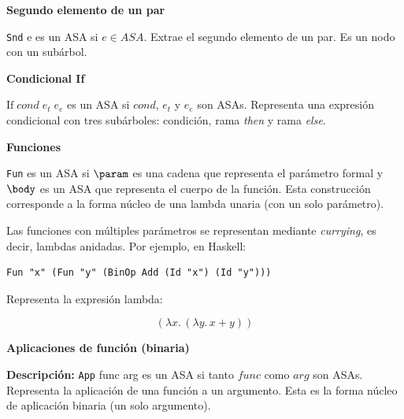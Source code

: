 \documentclass[a4paper,12pt]{article}
\begin{document}
\begin{tcolorbox}[title=Correción:ASA de  LAMBDAE    MÓDULO A3, breakable]
\textbf{Segundo elemento de un par}

 \texttt{Snd}\; e es un ASA si \( e \in ASA \). Extrae el segundo elemento de un par. Es un nodo con un sub\'arbol.

\begin{prooftree}
\end{prooftree}

\textbf{Condicional If}

\(\mathrm{If}\;\mathit{cond}\;\mathit{e_{t}}\;\mathit{e_{e}}\) es un ASA si 
\(\mathit{cond}\), \(\mathit{e_{t}}\) y \(\mathit{e_{e}}\) son ASAs. Representa una expresi\'on condicional con tres sub\'arboles: condici\'on, rama \textit{then} y rama \textit{else}.


\begin{prooftree}
\end{prooftree}

\textbf{Funciones}

\texttt{Fun}\; \param\; \body\; es un ASA si 
\(\param\) es una cadena que representa el par\'ametro formal y 
\(\body\) es un ASA que representa el cuerpo de la funci\'on.
Esta construcci\'on corresponde a la forma n\'ucleo de una lambda unaria (con un solo par\'ametro).


\begin{prooftree}
\end{prooftree}

\medskip

Las funciones con m\'ultiples par\'ametros se representan mediante \textit{currying}, es decir, lambdas anidadas.  
Por ejemplo, en Haskell:

\begin{verbatim}
Fun "x" (Fun "y" (BinOp Add (Id "x") (Id "y")))
\end{verbatim}

Representa la expresi\'on lambda:

\[
(\lambda x.\, (\lambda y.\, x + y))
\]

\textbf{Aplicaciones de función (binaria)}

\textbf{Descripci\'on:} \texttt{App}\; func\; arg es un ASA si tanto \(func\) como \(arg\) son ASAs. 
Representa la aplicaci\'on de una funci\'on a un argumento. 
Esta es la forma n\'ucleo de aplicaci\'on binaria (un solo argumento).



\end{tcolorbox}
\end{document}
